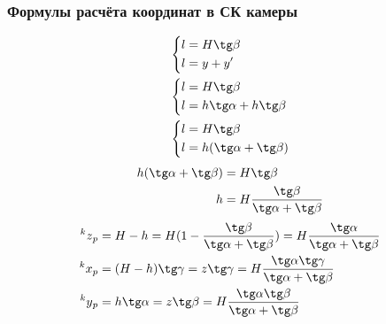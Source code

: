 \documentclass[a4paper, 12pt]{article}
\begin{document}
    \subsubsection{Формулы расчёта координат в СК камеры}
    \begin{equation*}
        \begin{split}
            &\left\{
            \begin{aligned}
                l &= H \tg \beta \\
                l &= y + y'\\
            \end{aligned}
            \right.\\
            &\left\{
            \begin{aligned}
                l &= H \tg \beta \\
                l &= h \tg \alpha + h\tg\beta\\
            \end{aligned}
            \right.\\
            &\left\{
            \begin{aligned}
                l &= H \tg \beta \\
                l &= h(\tg\alpha+\tg\beta)\\
            \end{aligned}
            \right.\\
        \end{split}
    \end{equation*}
    \begin{equation*}
        \begin{split}
            h(\tg\alpha+\tg\beta)&=H\tg\beta\\
            h &= H\dfrac{\tg\beta}{\tg\alpha+\tg\beta}\\
        \end{split}
    \end{equation*}
    \begin{equation*}
        \begin{split}
            \prescript{k}{}{z}_p &= H-h = H(1-\frac{\tg\beta}{\tg\alpha+\tg\beta}) = H\dfrac{\tg\alpha}{\tg\alpha+\tg\beta}\\
            \prescript{k}{}{x}_p &= (H-h)\tg\gamma = z\tg\gamma = H\dfrac{\tg\alpha\tg\gamma}{\tg\alpha+\tg\beta}\\
            \prescript{k}{}{y}_p &= h\tg\alpha = z\tg\beta = H\dfrac{\tg\alpha\tg\beta}{\tg\alpha+\tg\beta}
        \end{split}
    \end{equation*}
\end{document}
